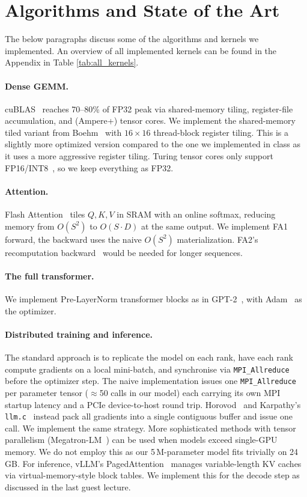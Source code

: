 \documentclass[11pt,letterpaper]{article}
\begin{document}
\section{Algorithms and State of the Art}
The below paragraphs discuss some of the algorithms and kernels we implemented. An overview of all implemented kernels can be found in the Appendix in Table \ref{tab:all_kernels}.

\paragraph{Dense GEMM.}
cuBLAS~\cite{cublas} reaches 70--80\% of FP32 peak via shared-memory
tiling, register-file accumulation, and (Ampere+) tensor cores. We
implement the shared-memory tiled variant from Boehm~\cite{boehm2022} with
$16{\times}16$ thread-block register tiling. This is a slightly more optimized version compared to the one we implemented in class as it uses a more aggressive register tiling. Turing tensor cores only support
FP16/INT8~\cite{micikevicius2018}, so we keep everything as FP32.

\paragraph{Attention.}
Flash Attention~\cite{dao2022} tiles $Q, K, V$ in SRAM with an online
softmax, reducing memory from $O(S^2)$ to $O(S{\cdot}D)$ at the same output.
We implement FA1 forward, the backward uses the naive $O(S^2)$
materialization. FA2's recomputation backward~\cite{dao2023} would be
needed for longer sequences.

\paragraph{The full transformer.}
We implement Pre-LayerNorm transformer blocks as in GPT-2~\cite{radford2019},
with Adam~\cite{kingma2015} as the optimizer.

\paragraph{Distributed training and inference.}
The standard approach is to replicate the model on each rank, have each rank
compute gradients on a local mini-batch, and synchronise via \texttt{MPI\_Allreduce}
before the optimizer step. The naive implementation issues one \texttt{MPI\_Allreduce}
per parameter tensor ($\approx$50 calls in our model) each carrying its own
MPI startup latency and a PCIe device-to-host round trip. Horovod~\cite{sergeev2018}
and Karpathy's \texttt{llm.c}~\cite{karpathy2024} instead pack all gradients into
a single contiguous buffer and issue one call. We implement the same strategy. More sophisticated methods with tensor parallelism (Megatron-LM~\cite{shoeybi2019}) can be used when models exceed single-GPU memory. We do not employ this as our 5\,M-parameter model fits trivially on 24\,GB. For inference, vLLM's
PagedAttention~\cite{kwon2023} manages variable-length KV caches via
virtual-memory-style block tables. We implement this for the decode step as discussed in the last guest lecture.
\end{document}

